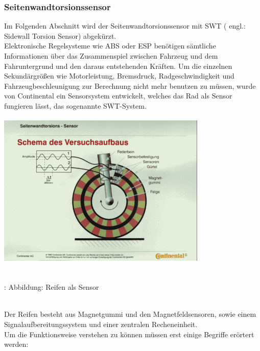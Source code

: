 \documentclass{article}
\begin{document}
			\subsubsection{Seitenwandtorsionssensor}
				Im Folgenden Abschnitt wird der Seitenwandtorsionssensor mit SWT ( engl.: Sidewall Torsion Sensor) abgekürzt.\\ 
				Elektronische Regelsysteme wie ABS oder ESP benötigen sämtliche Informationen über das Zusammenspiel zwischen Fahrzeug und dem Fahruntergrund und den daraus entstehenden Kräften. Um die einzelnen Sekundärgrößen wie Motorleistung, Bremsdruck, Radgeschwindigkeit und Fahrzeugbeschleunigung zur Berechnung nicht mehr benutzen zu müssen, wurde von Continental ein Sensorsystem entwickelt, welches das Rad als Sensor fungieren lässt, das sogenannte SWT-System.
				
				\begin{center}
					\includegraphics[width=10cm, height=7.5cm] {Images/Kapitel5/swt1.png}
					\caption {\\\cite{TS17}: Abbildung: Reifen als Sensor}
				\end{center}\\
			
				Der Reifen besteht aus Magnetgummi und den Magnetfeldsensoren, sowie einem Signalaufbereitungssystem und einer zentralen Recheneinheit.\\
				Um die Funktionsweise verstehen zu können müssen erst einige Begriffe erörtert werden:
				
\end{document}
